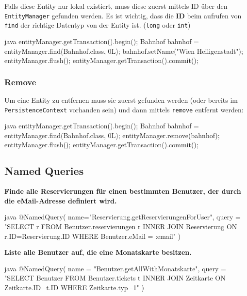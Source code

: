 Falls diese Entity nur lokal existiert, muss diese zuerst mittels ID über den \texttt{EntityManager} gefunden werden. Es ist wichtig, dass die \textbf{ID} beim aufrufen von \texttt{find} der richtige Datentyp von der Entity ist. (\texttt{long} oder \texttt{int})

\begin{code}{java}
entityManager.getTransaction().begin();
Bahnhof bahnhof = entityManager.find(Bahnhof.class, 0L);
bahnhof.setName("Wien Heiligenstadt");
entityManager.flush();
entityManager.getTransaction().commit();
\end{code}

\subsubsection{Remove}

Um eine Entity zu entfernen muss sie zuerst gefunden werden (oder bereits im \texttt{PersistenceContext} vorhanden sein) und dann mittels \texttt{remove} entfernt werden:

\begin{code}{java}
entityManager.getTransaction().begin();
Bahnhof bahnhof = entityManager.find(Bahnhof.class, 0L);
entityManager.remove(bahnhof);
entityManager.flush();
entityManager.getTransaction().commit();
\end{code}

\clearpage
\subsection{Named Queries}

\textbf{Finde alle Reservierungen für einen bestimmten Benutzer, der durch die eMail-Adresse definiert wird.}

\begin{code}{java}
@NamedQuery(
    name="Reservierung.getReservierungenForUser",
    query = "SELECT r FROM Benutzer.reservierungen r INNER JOIN Reservierung ON r.ID=Reservierung.ID WHERE Benutzer.eMail = :email"
)
\end{code}

\textbf{Liste alle Benutzer auf, die eine Monatskarte besitzen.}

\begin{code}{java}
@NamedQuery(
    name = "Benutzer.getAllWithMonatskarte",
    query = "SELECT Benutzer FROM Benutzer.tickets t INNER JOIN Zeitkarte ON Zeitkarte.ID=t.ID WHERE Zeitkarte.typ=1"
)
\end{code}

